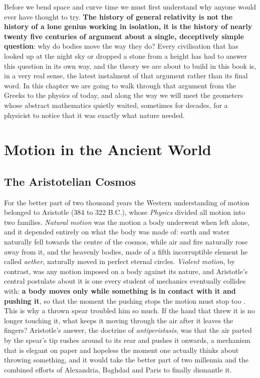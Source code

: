 Before we bend space and curve time we must first understand why anyone would ever have thought to try. \textbf{The history of general relativity is not the history of a lone genius working in isolation, it is the history of nearly twenty five centuries of argument about a single, deceptively simple question}: why do bodies move the way they do? Every civilisation that has looked up at the night sky or dropped a stone from a height has had to answer this question in its own way, and the theory we are about to build in this book is, in a very real sense, the latest instalment of that argument rather than its final word. In this chapter we are going to walk through that argument from the Greeks to the physics of today, and along the way we will meet the geometers whose abstract mathematics quietly waited, sometimes for decades, for a physicist to notice that it was exactly what nature needed.

\section{Motion in the Ancient World}

    \subsection{The Aristotelian Cosmos}

    For the better part of two thousand years the Western understanding of motion belonged to Aristotle (384 to 322 B.C.), whose \textit{Physics} divided all motion into two families. \textit{Natural motion} was the motion a body underwent when left alone, and it depended entirely on what the body was made of: earth and water naturally fell towards the centre of the cosmos, while air and fire naturally rose away from it, and the heavenly bodies, made of a fifth incorruptible element he called \textit{aether}, naturally moved in perfect eternal circles. \textit{Violent motion}, by contrast, was any motion imposed on a body against its nature, and Aristotle's central postulate about it is one every student of mechanics eventually collides with: \textbf{a body moves only while something is in contact with it and pushing it}, so that the moment the pushing stops the motion must stop too \citep{aristotle_physics}. This is why a thrown spear troubled him so much. If the hand that threw it is no longer touching it, what keeps it moving through the air after it leaves the fingers? Aristotle's answer, the doctrine of \textit{antiperistasis}, was that the air parted by the spear's tip rushes around to its rear and pushes it onwards, a mechanism that is elegant on paper and hopeless the moment one actually thinks about throwing something, and it would take the better part of two millennia and the combined efforts of Alexandria, Baghdad and Paris to finally dismantle it.

